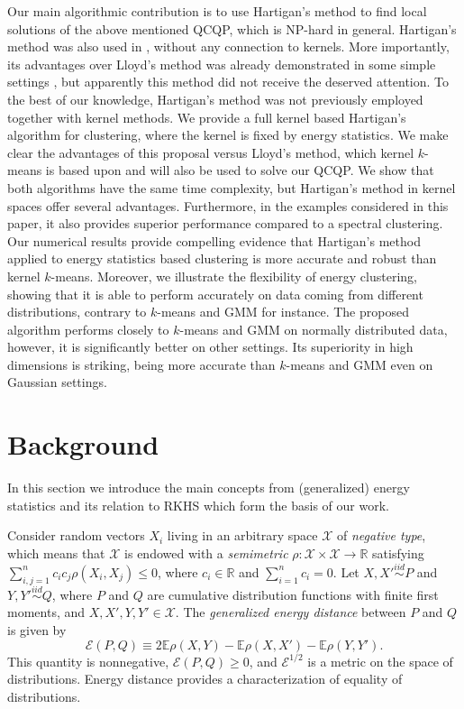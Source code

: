 \documentclass[twoside]{article}
\newcommand\Energy{\mathcal{E}}
\newcommand\E{\mathbb{E}}
\begin{document}
Our main 
algorithmic contribution is to use Hartigan's method \citep{Hartigan} to 
find local solutions of the above mentioned QCQP, which is NP-hard in general.
Hartigan's method was also used in \citep{Kgroups}, without any
connection to kernels. More importantly, its 
advantages
over Lloyd's method was already demonstrated 
in some simple settings
\citep{Telgarsky,Slonin}, but apparently this method did not receive 
the deserved attention. To the 
best of our knowledge, Hartigan's method was not previously 
employed together with kernel methods. 
We provide a full kernel based Hartigan's algorithm for clustering,
where the kernel is fixed by energy statistics. 
We make clear the advantages of this proposal versus 
Lloyd's method, which kernel $k$-means is based upon and will also be used 
to solve our QCQP. We show that both algorithms  have the same
time complexity, but Hartigan's method in kernel spaces offer several
advantages. Furthermore, in the examples considered in this paper, it 
also provides superior performance compared to a spectral clustering.
Our numerical results provide compelling evidence that 
Hartigan's method applied to energy statistics based clustering
is more accurate and robust than 
kernel $k$-means. Moreover, we illustrate the
flexibility of energy clustering,  
showing that it is able to perform accurately on data coming from 
different distributions, contrary to $k$-means and GMM for instance.
The proposed algorithm performs 
closely to $k$-means and GMM on normally distributed data, however,
it is significantly better on other settings. 
Its superiority in high dimensions is striking, being more accurate 
than $k$-means and GMM even on Gaussian settings.


\section{Background}
\label{sec:background}

In this section we introduce the main concepts from (generalized) energy
statistics \citep{Szkely2013,Lyons} and its relation to 
RKHS \citep{Sejdinovic2013}
which form the basis of our work.

Consider random vectors $X_i$ living in an arbitrary space
$\mathcal{X}$ of \emph{negative type}, which means that $\mathcal{X}$
is endowed with a \emph{semimetric} 
$\rho: \mathcal{X}\times\mathcal{X} \to \mathbb{R}$ satisfying
$\sum_{i,j=1}^n c_i c_j \rho(X_i, X_j) \le 0$,
where $c_i \in \mathbb{R}$ and
$\sum_{i=1}^n c_i = 0$. 
Let $X,X' \stackrel{iid}{\sim} P$ and 
$Y,Y' \stackrel{iid}{\sim} Q$, where $P$ and $Q$ are cumulative
distribution functions with finite first moments, and 
$X,X',Y,Y' \in \mathcal{X}$. 
The \emph{generalized energy distance} between $P$ and $Q$ is
given by 
\begin{equation}
\label{eq:energy3}
\Energy(P, Q) \equiv 2 \E \rho(X,Y) - \E \rho(X, X') - \E \rho(Y,Y').
\end{equation} 
This quantity is nonnegative, $\Energy(P,Q) \ge 0$, and 
$\Energy^{1/2}$ is
a metric on the space of distributions. Energy distance provides
a characterization of equality of distributions.
\end{document}
